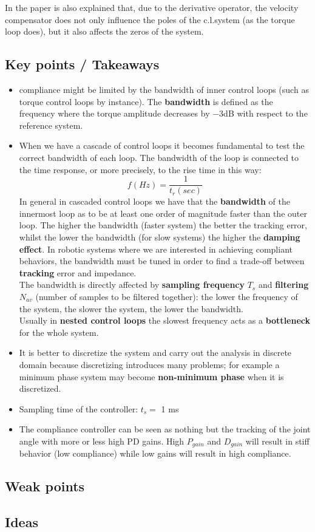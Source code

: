 In the paper is also explained that, due to the derivative operator, the velocity compensator does not only influence the poles of the c.l.system (as the torque loop does), but it also affects the zeros of the system.
\subsection*{Key points / Takeaways}
\begin{itemize}
\item compliance might be limited by the bandwidth of inner control loops (such as torque control loops by instance). The \textbf{bandwidth} is defined as the frequency where the torque amplitude decreases by $-3$dB with respect to the reference system.
\item When we have a cascade of control loops it becomes fundamental to test the correct bandwidth of each loop. The bandwidth of the loop is connected to the time response, or more precisely, to the rise time in this way: $$ f(Hz) = \frac{1}{t_r(sec)}$$
In general in cascaded control loops we have that the \textbf{bandwidth} of the innermost loop as to be at least one order of magnitude faster than the outer loop. The higher the bandwidth (faster system) the better the tracking error, whilst the lower the bandwidth (for slow systems) the higher the \textbf{damping effect}. In robotic systems where we are interested in achieving compliant behaviors, the bandwidth must be tuned in order to find a trade-off between \textbf{tracking} error and impedance.\\
The bandwidth is directly affected by \textbf{sampling frequency} $T_s$ and \textbf{filtering} $N_{av}$ (number of samples to be filtered together): the lower the frequency of the system, the slower the system, the lower the bandwidth.\\
Usually in \textbf{nested control loops} the slowest frequency acts as a \textbf{bottleneck} for the whole system.
\item It is better to discretize the system and carry out the analysis in discrete domain because discretizing introduces many problems; for example a minimum phase system may become \textbf{non-minimum phase} when it is discretized.
\item Sampling time of the controller: $t_s=$ 1 ms
\item The compliance controller can be seen as nothing but the tracking of the joint angle with more or less high PD gains. High $P_{gain}$ and $D_{gain}$ will result in stiff behavior (low compliance) while low gains will result in high compliance.
\end{itemize}
\subsection*{Weak points}
\subsection*{Ideas}